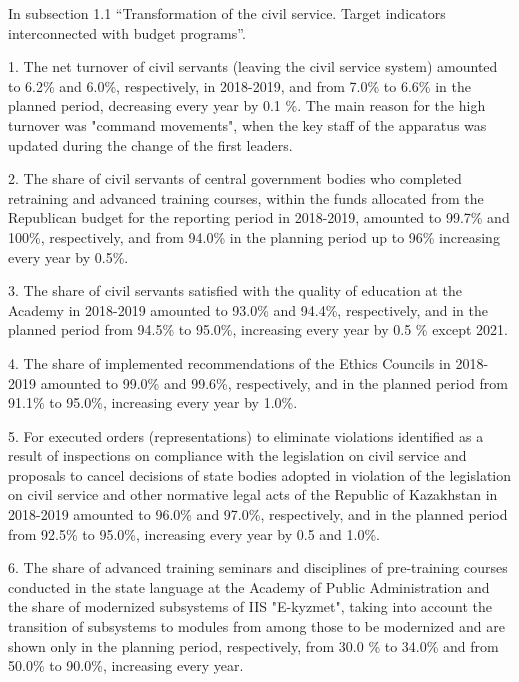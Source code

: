 \begin{multicols}{2}
In subsection 1.1 ``Transformation of the civil service. Target
indicators interconnected with budget programs''.

1. The net turnover of civil servants (leaving the civil service system)
amounted to 6.2\% and 6.0\%, respectively, in 2018-2019, and from 7.0\%
to 6.6\% in the planned period, decreasing every year by 0.1 \%. The
main reason for the high turnover was "command movements", when the key
staff of the apparatus was updated during the change of the first
leaders.

2. The share of civil servants of central government bodies who
completed retraining and advanced training courses, within the funds
allocated from the Republican budget for the reporting period in
2018-2019, amounted to 99.7\% and 100\%, respectively, and from 94.0\%
in the planning period up to 96\% increasing every year by 0.5\%.

3. The share of civil servants satisfied with the quality of education
at the Academy in 2018-2019 amounted to 93.0\% and 94.4\%, respectively,
and in the planned period from 94.5\% to 95.0\%, increasing every year
by 0.5 \% except 2021.

4. The share of implemented recommendations of the Ethics Councils in
2018-2019 amounted to 99.0\% and 99.6\%, respectively, and in the
planned period from 91.1\% to 95.0\%, increasing every year by 1.0\%.

5. For executed orders (representations) to eliminate violations
identified as a result of inspections on compliance with the legislation
on civil service and proposals to cancel decisions of state bodies
adopted in violation of the legislation on civil service and other
normative legal acts of the Republic of Kazakhstan in 2018-2019 amounted
to 96.0\% and 97.0\%, respectively, and in the planned period from
92.5\% to 95.0\%, increasing every year by 0.5 and 1.0\%.

6. The share of advanced training seminars and disciplines of
pre-training courses conducted in the state language at the Academy of
Public Administration and the share of modernized subsystems of IIS
"E-kyzmet", taking into account the transition of subsystems to modules
from among those to be modernized and are shown only in the planning
period, respectively, from 30.0 \% to 34.0\% and from 50.0\% to 90.0\%,
increasing every year.


\end{multicols}

